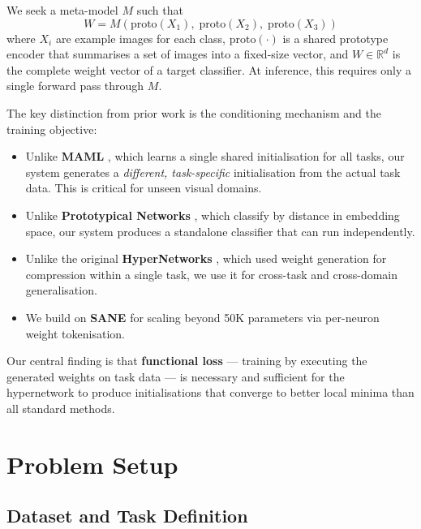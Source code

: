\documentclass[11pt,a4paper]{article}
\begin{document}
We seek a meta-model $M$ such that
\begin{equation}
    W = M\!\left(\text{proto}(X_1),\; \text{proto}(X_2),\; \text{proto}(X_3)\right)
    \label{eq:core}
\end{equation}
where $X_i$ are example images for each class, $\text{proto}(\cdot)$ is a shared prototype encoder that summarises a set of images into a fixed-size vector, and $W \in \mathbb{R}^d$ is the complete weight vector of a target classifier. At inference, this requires only a single forward pass through $M$.

The key distinction from prior work is the conditioning mechanism and the training objective:
\begin{itemize}[noitemsep]
    \item Unlike \textbf{MAML} \cite{finn2017model}, which learns a single shared initialisation for all tasks, our system generates a \emph{different, task-specific} initialisation from the actual task data. This is critical for unseen visual domains.
    \item Unlike \textbf{Prototypical Networks} \cite{snell2017prototypical}, which classify by distance in embedding space, our system produces a standalone classifier that can run independently.
    \item Unlike the original \textbf{HyperNetworks} \cite{ha2016hypernetworks}, which used weight generation for compression within a single task, we use it for cross-task and cross-domain generalisation.
    \item We build on \textbf{SANE} \cite{schurholt2024towards} for scaling beyond 50K parameters via per-neuron weight tokenisation.
\end{itemize}

Our central finding is that \textbf{functional loss} --- training by executing the generated weights on task data --- is necessary and sufficient for the hypernetwork to produce initialisations that converge to better local minima than all standard methods.

\section{Problem Setup}
\label{sec:setup}

\subsection{Dataset and Task Definition}
\end{document}
